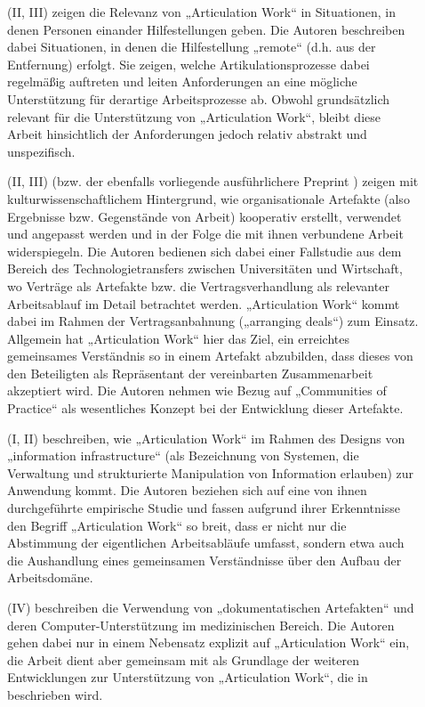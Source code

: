\begin{description}
	\item[\citet{Crabtree06}] (II, III) zeigen die Relevanz von „Articulation Work“ in Situationen, in denen Personen einander Hilfestellungen geben. Die Autoren beschreiben dabei Situationen, in denen die Hilfestellung „remote“ (d.h. aus der Entfernung) erfolgt. Sie zeigen, welche Artikulationsprozesse dabei regelmäßig auftreten und leiten Anforderungen an eine mögliche Unterstützung für derartige Arbeitsprozesse ab. Obwohl grundsätzlich relevant für die Unterstützung von „Articulation Work“, bleibt diese Arbeit hinsichtlich der Anforderungen jedoch relativ abstrakt und unspezifisch. 
	\item[\citet{Kaghan06}] (II, III) (bzw. der ebenfalls vorliegende ausführlichere Preprint \citep{Kaghan04}) zeigen mit kulturwissenschaftlichem Hintergrund, wie organisationale Artefakte (also Ergebnisse bzw. Gegenstände von Arbeit) kooperativ erstellt, verwendet und angepasst werden und in der Folge die mit ihnen verbundene Arbeit widerspiegeln. Die Autoren bedienen sich dabei einer Fallstudie aus dem Bereich des Technologietransfers zwischen Universitäten und Wirtschaft, wo Verträge als Artefakte bzw. die Vertragsverhandlung als relevanter Arbeitsablauf im Detail betrachtet werden. „Articulation Work“ kommt dabei im Rahmen der Vertragsanbahnung („arranging deals“) zum Einsatz. Allgemein hat „Articulation Work“ hier das Ziel, ein erreichtes gemeinsames Verständnis so in einem Artefakt abzubilden, dass dieses von den Beteiligten als Repräsentant der vereinbarten Zusammenarbeit akzeptiert wird. Die Autoren nehmen wie \citet{Davenport02} Bezug auf „Communities of Practice“ als wesentliches Konzept bei der Entwicklung dieser Artefakte.
	\item[\citet{Baker07}] (I, II) beschreiben, wie „Articulation Work“ im Rahmen des Designs von „information infrastructure“ (als Bezeichnung von Systemen, die Verwaltung und strukturierte Manipulation von Information erlauben) zur Anwendung kommt. Die Autoren beziehen sich auf eine von ihnen durchgeführte empirische Studie und fassen aufgrund ihrer Erkenntnisse den Begriff „Articulation Work“ so breit, dass er nicht nur die Abstimmung der eigentlichen Arbeitsabläufe umfasst, sondern etwa auch die Aushandlung eines gemeinsamen Verständnisse über den Aufbau der Arbeitsdomäne. 
	\item[\citet{Cabitza07}] (IV) beschreiben die Verwendung von „dokumentatischen Artefakten“ und deren Computer-Unterstützung im medizinischen Bereich. Die Autoren gehen dabei nur in einem Nebensatz explizit auf „Articulation Work“ ein, die Arbeit dient aber gemeinsam mit \citet{Cabitza06} als Grundlage der weiteren Entwicklungen zur Unterstützung von „Articulation Work“, die in \citep{Cabitza09} beschrieben wird.

\end{description}
